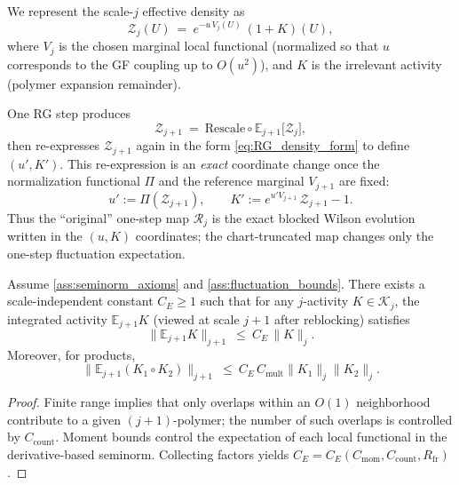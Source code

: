We represent the scale-$j$ effective density as
\begin{equation}\label{eq:RG_density_form}
\mathcal Z_j(U)\ =\ e^{-u\,V_j(U)}\ (1+K)(U),
\end{equation}
where $V_j$ is the chosen marginal local functional (normalized so that $u$ corresponds to the GF coupling up to $O(u^2)$),
and $K$ is the irrelevant activity (polymer expansion remainder).

One RG step produces
\[
\mathcal Z_{j+1}\ =\ \mathrm{Rescale}\circ \mathbb E_{j+1}\bigl[\mathcal Z_j\bigr],
\]
then re-expresses $\mathcal Z_{j+1}$ again in the form \eqref{eq:RG_density_form} to define $(u',K')$.
This re-expression is an \emph{exact} coordinate change once the normalization functional $\Pi$ and the reference marginal $V_{j+1}$ are fixed:
\[
u' := \Pi(\mathcal Z_{j+1}),\qquad
K' := e^{u' V_{j+1}}\,\mathcal Z_{j+1}-1.
\]
Thus the ``original'' one-step map $\mathcal R_j$ is the exact blocked Wilson evolution written in the $(u,K)$ coordinates; the chart-truncated map changes only the one-step fluctuation expectation.

\begin{lemma}\label{lem:E_bounded}
Assume \ref{ass:seminorm_axioms} and \ref{ass:fluctuation_bounds}.
There exists a scale-independent constant $C_E\ge 1$ such that for any $j$-activity $K\in\mathscr K_j$,
the integrated activity $\mathbb E_{j+1}K$ (viewed at scale $j+1$ after reblocking) satisfies
\[
\|\mathbb E_{j+1}K\|_{j+1}\ \le\ C_E\,\|K\|_j.
\]
Moreover, for products,
\[
\|\mathbb E_{j+1}(K_1\circ K_2)\|_{j+1}\ \le\ C_E\,C_{\mathrm{mult}}\|K_1\|_j\|K_2\|_j.
\]
\end{lemma}

\begin{proof}
Finite range implies that only overlaps within an $O(1)$ neighborhood contribute to a given $(j+1)$-polymer; the number of such overlaps is controlled by $C_{\mathrm{count}}$.
Moment bounds control the expectation of each local functional in the derivative-based seminorm.
Collecting factors yields $C_E=C_E(C_{\mathrm{mom}},C_{\mathrm{count}},R_{\mathrm{fr}})$.
\end{proof}

